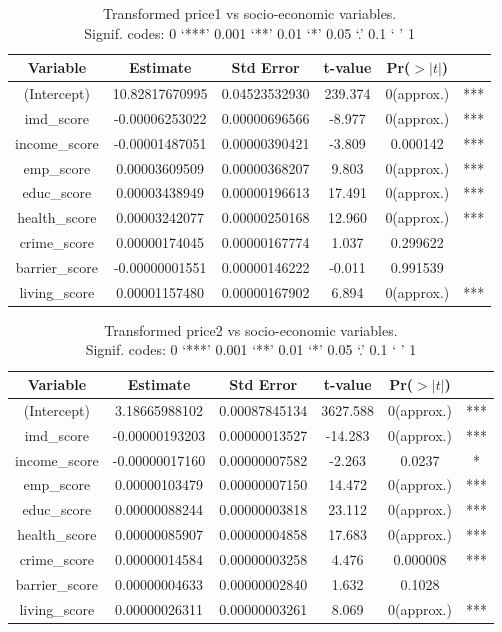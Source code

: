\documentclass[12pt]{article}
\begin{document}
\begin{table}[H]
\centering
\begin{tabular}{c c c c c c} 
 \hline
 Variable & Estimate & Std Error & t-value & Pr($>|t|$) &   \\ [0.5ex] 
 \hline
 (Intercept) & 10.82817670995 & 0.04523532930 & 239.374 & 0(approx.) & *** \\
 imd\_score & -0.00006253022 & 0.00000696566 & -8.977 & 0(approx.) & *** \\
 income\_score & -0.00001487051 & 0.00000390421 & -3.809 & 0.000142 & *** \\
 emp\_score & 0.00003609509 & 0.00000368207 & 9.803 & 0(approx.) & *** \\
 educ\_score & 0.00003438949 & 0.00000196613 & 17.491 & 0(approx.) & *** \\
 health\_score & 0.00003242077 & 0.00000250168 & 12.960 & 0(approx.) & *** \\
 crime\_score & 0.00000174045 & 0.00000167774 & 1.037 & 0.299622 &  \\
 barrier\_score & -0.00000001551 & 0.00000146222 & -0.011 & 0.991539 &  \\  
 living\_score & 0.00001157480 & 0.00000167902 & 6.894 & 0(approx.) & *** \\ [1ex]
 \hline
\end{tabular}
\captionsetup{justification=centering}  
\caption{Transformed \gls{price1} vs socio-economic variables.\\ Signif. codes:  0 `***' 0.001 `**' 0.01 `*' 0.05 `.' 0.1 ` ' 1}
\label{table:3}
\end{table}

\begin{table}[H]
\centering
\begin{tabular}{c c c c c c} 
 \hline
 Variable & Estimate & Std Error & t-value & Pr($>|t|$) &  \\ [0.5ex] 
 \hline
 (Intercept) & 3.18665988102 & 0.00087845134 & 3627.588 & 0(approx.) & *** \\
 imd\_score & -0.00000193203 & 0.00000013527 & -14.283 & 0(approx.) & *** \\
 income\_score & -0.00000017160 & 0.00000007582 & -2.263 & 0.0237 & * \\ 
 emp\_score & 0.00000103479 & 0.00000007150 & 14.472 & 0(approx.) & *** \\
 educ\_score & 0.00000088244 & 0.00000003818 & 23.112 & 0(approx.) & *** \\
 health\_score & 0.00000085907 & 0.00000004858 & 17.683 & 0(approx.) & *** \\
 crime\_score & 0.00000014584 & 0.00000003258 & 4.476 & 0.000008 & *** \\
 barrier\_score & 0.00000004633 & 0.00000002840 & 1.632 & 0.1028 &  \\  
 living\_score & 0.00000026311 & 0.00000003261 & 8.069 & 0(approx.) & *** \\ [1ex]
 \hline
\end{tabular}
\captionsetup{justification=centering}
\caption{Transformed \gls{price2} vs socio-economic variables.\\Signif. codes:  0 `***' 0.001 `**' 0.01 `*' 0.05 `.' 0.1 ` ' 1}
\label{table:4}
\end{table}
\end{document}
